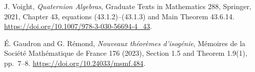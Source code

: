 J. Voight, \emph{Quaternion Algebras}, Graduate Texts in Mathematics 288,
Springer, 2021, Chapter 43, equations (43.1.2)--(43.1.3) and
Main Theorem 43.6.14.
\url{https://doi.org/10.1007/978-3-030-56694-4_43}.

\'E. Gaudron and G. R\'emond, \emph{Nouveaux th\'eor\`emes d'isog\'enie},
M\'emoires de la Soci\'et\'e Math\'ematique de France 176 (2023),
Section 1.5 and Theorem 1.9(1), pp.~7--8.
\url{https://doi.org/10.24033/msmf.484}.

